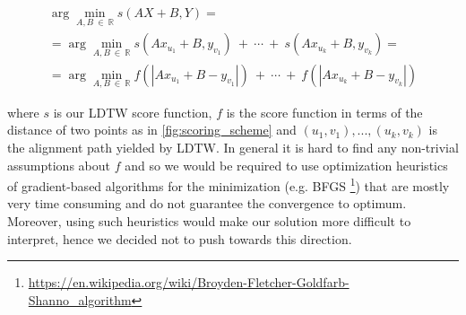 \begin{multline}
    \arg\min_{A, B ~\in~ \mathbb{R}} s \left(AX + B, Y \right) =\\
    = \arg\min_{A, B ~\in~ \mathbb{R}} s \left( Ax_{u_1} + B, y_{v_1} \right) ~+~  \cdots ~+~ s \left( Ax_{u_k} + B,  y_{v_k} \right) =\\
    = \arg\min_{A, B ~\in~ \mathbb{R}} f \left( |Ax_{u_1} + B - y_{v_1}| \right) ~+~ \cdots ~+~ f \left( |Ax_{u_k} + B - y_{v_k}| \right)
\end{multline}

where $s$ is our LDTW score function, $f$ is the score function in terms of the distance of two points as in \ref{fig:scoring_scheme} and $(u_1, v_1),...,(u_k, v_k)$ is the alignment path yielded by LDTW. In general it is hard to find any non-trivial assumptions about $f$ and so we would be required to use optimization heuristics of gradient-based algorithms for the minimization (e.g. BFGS \footnote{\url{https://en.wikipedia.org/wiki/Broyden-Fletcher-Goldfarb-Shanno\_algorithm}}) that are mostly very time consuming and do not guarantee the convergence to optimum. Moreover, using such heuristics would make our solution more difficult to interpret, hence we decided not to push towards this direction.
